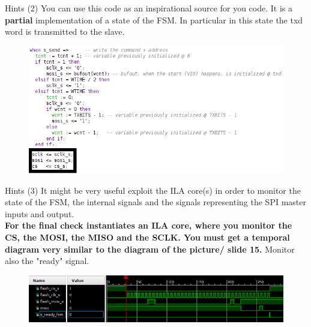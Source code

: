 \documentclass{beamer}
\begin{document}
   \begin{frame}{Hints (2)}
   You can use this code as an inspirational source for you code. It is a \textbf{partial} implementation of a state of the FSM. In particular in this state the txd word is transmitted to the slave.
    	\begin{figure}[!tbh]
    		\centering
    		\includegraphics*[width=1\textwidth]{images/code}
    	\end{figure}        
   \end{frame}    
 
   \begin{frame}{Hints (3)}
   	It might be very useful exploit the ILA core(s) in order to monitor the state of the FSM, the internal signals and the signals representing the SPI master inputs and output.
   	\vspace{1cm}
   	 \\\textbf{For the final check instantiates an ILA core, where you monitor the CS, the MOSI, the MISO and the SCLK. You must get a temporal diagram very similar to the diagram of the picture/ slide 15.} Monitor also the "ready" signal.
    	\begin{figure}[!tbh]
    		\centering
    		\includegraphics*[width=1\textwidth]{images/ila}
    	\end{figure}        
    \end{frame}      
                
\end{document}
